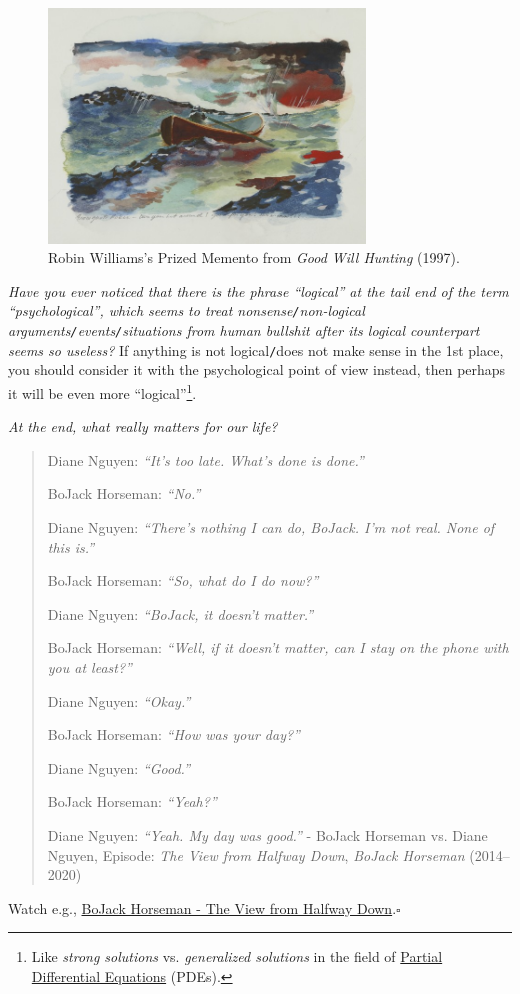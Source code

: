 \documentclass[12pt]{article}
\numberwithin{equation}{section}
\begin{document}
\begin{figure}[h]
    \centering
    \includegraphics[width=0.75\textwidth]{boat_under_storm}
    \caption{Robin Williams's Prized Memento from \textit{Good Will Hunting} (1997).}
    \label{fig6}
\end{figure}
\textit{Have you ever noticed that there is the phrase ``logical'' at the tail end of the term ``psychological'', which seems to treat nonsense\texttt{/}non-logical arguments\texttt{/}events\texttt{/}situations from human bullshit after its logical counterpart seems so useless?} If anything is not logical\texttt{/}does not make sense in the 1st place, you should consider it with the psychological point of view instead, then perhaps it will be even more ``logical''\footnote{Like \textit{strong solutions} vs. \textit{generalized solutions} in the field of \href{https://en.wikipedia.org/wiki/Partial_differential_equation}{Partial Differential Equations} (PDEs).}.
 
\textit{At the end, what really matters for our life?}
\begin{quotation}
    Diane Nguyen: \textit{``It's too late. What's done is done.''}
    
    BoJack Horseman: \textit{``No.''}
    
    Diane Nguyen: \textit{``There's nothing I can do, BoJack. I'm not real. None of this is.''}
    
    BoJack Horseman: \textit{``So, what do I do now?''}
    
    Diane Nguyen: \textit{``BoJack, it doesn't matter.''}
    
    BoJack Horseman: \textit{``Well, if it doesn't matter, can I stay on the phone with you at least?''}
    
    Diane Nguyen: \textit{``Okay.''}
    
    BoJack Horseman: \textit{``How was your day?''}
    
    Diane Nguyen: \textit{``Good.''}
    
    BoJack Horseman: \textit{``Yeah?''}
    
    Diane Nguyen: \textit{``Yeah. My day was good.''} - BoJack Horseman vs. Diane Nguyen,  Episode: \textit{The View from Halfway Down}, \textit{BoJack Horseman} (2014--2020)
\end{quotation}
Watch e.g., \href{https://www.youtube.com/watch?v=Pt21dU5Pu8g}{BoJack Horseman - The View from Halfway Down}.\hfill$\square$
\end{document}
